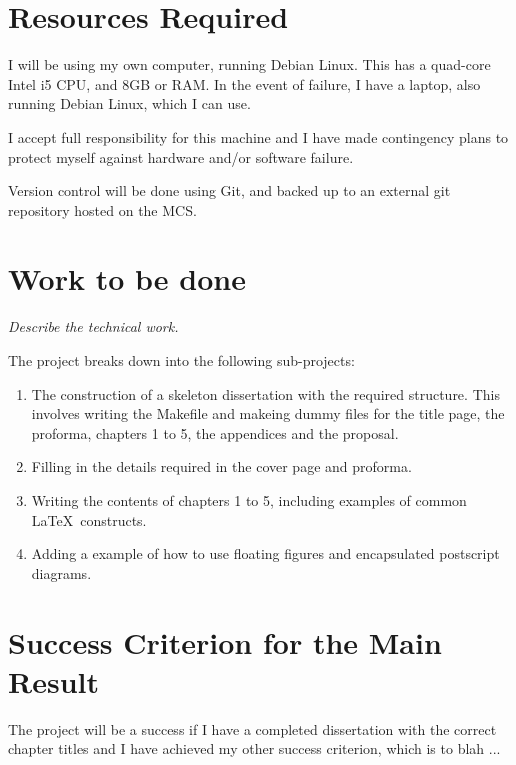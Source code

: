\section*{Resources Required}

  I will be using my own computer, running Debian Linux. This has a quad-core
  Intel i5 CPU, and 8GB or RAM. In the event of failure, I have a laptop, also
  running Debian Linux, which I can use.

  I accept full responsibility for this machine and I have made contingency
  plans to protect myself against hardware and/or software failure.

  Version control will be done using Git, and backed up to an external git
  repository hosted on the MCS.

\section*{Work to be done}

  {\em Describe the technical work.}

  The project breaks down into the following sub-projects:

  \begin{enumerate}
    \item The construction of a skeleton dissertation with the required
    structure. This involves writing the Makefile and makeing dummy files for
    the title page, the proforma, chapters 1 to 5, the appendices and the
    proposal.

    \item Filling in the details required in the cover page and proforma.

    \item Writing the contents of chapters 1 to 5, including examples of common
    \LaTeX\ constructs.

    \item Adding a example of how to use floating figures and encapsulated
    postscript diagrams.
  \end{enumerate}

\section*{Success Criterion for the Main Result}

  The project will be a success if I have a completed dissertation with the
  correct chapter titles and I have achieved my other success criterion, which
  is to blah ...

